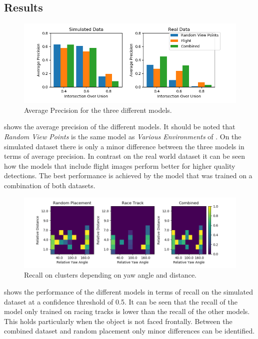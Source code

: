 \subsection{Results}

\begin{figure}[htbp]
	\includegraphics[width=\textwidth]{fig/view_bar}
	\caption{Average Precision for the three different models.}
	\label{fig:view_bar}
\end{figure}

 shows the average precision of the different models. It should be noted that \textit{Random View Points} is the same model as \textit{Various Environments} of . On the simulated dataset there is only a minor difference between the three models in terms of average precision. In contrast on the real world dataset it can be seen how the models that include flight images perform better for higher quality detections. The best performance is achieved by the model that was trained on a combination of both datasets.

\begin{figure}[htbp]
	\centering
	\includegraphics[width=\textwidth]{fig/recall_yaw}
	\caption{Recall on clusters depending on yaw angle and distance.}
	\label{fig:recall_yaw}
\end{figure}

 shows the performance of the different models in terms of recall on the simulated dataset at a confidence threshold of 0.5. It can be seen that the recall of the model only trained on racing tracks is lower than the recall of the other models. This holds particularly when the object is not faced frontally. Between the combined dataset and random placement only minor differences can be identified.

